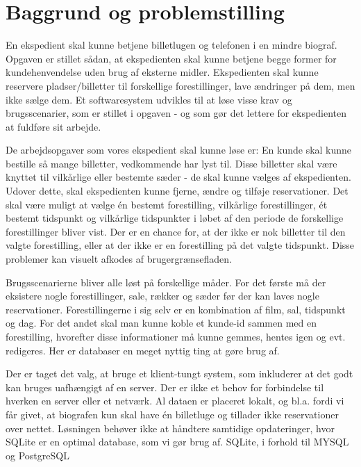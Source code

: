 \chapter{Baggrund og problemstilling}

En ekspedient skal kunne betjene billetlugen og telefonen i en mindre biograf. Opgaven er stillet sådan, at ekspedienten skal kunne betjene begge former for kundehenvendelse uden brug af eksterne midler. Ekspedienten skal kunne reservere pladser/billetter til forskellige forestillinger, lave ændringer på dem, men ikke sælge dem. Et softwaresystem udvikles til at løse visse krav og brugsscenarier, som er stillet i opgaven - og som gør det lettere for ekspedienten at fuldføre sit arbejde.

De arbejdsopgaver som vores ekspedient skal kunne løse er:
En kunde skal kunne bestille så mange billetter, vedkommende har lyst til. Disse billetter skal være knyttet til vilkårlige eller bestemte sæder - de skal kunne vælges af ekspedienten. Udover dette, skal ekspedienten kunne fjerne, ændre og tilføje reservationer. Det skal være muligt at vælge én bestemt forestilling, vilkårlige forestillinger, ét bestemt tidspunkt og vilkårlige tidspunkter i løbet af den periode de forskellige forestillinger bliver vist.
Der er en chance for, at der ikke er nok billetter til den valgte forestilling, eller at der ikke er en forestilling på det valgte tidspunkt. Disse problemer kan visuelt afkodes af brugergrænsefladen.

Brugsscenarierne bliver alle løst på forskellige måder. For det første må der eksistere nogle forestillinger, sale, rækker og sæder før der kan laves nogle reservationer. Forestillingerne i sig selv er en kombination af film, sal, tidspunkt og dag. For det andet skal man kunne koble et kunde-id sammen med en forestilling, hvorefter disse informationer må kunne gemmes, hentes igen og evt. redigeres. Her er databaser en meget nyttig ting at gøre brug af. 

Der er taget det valg, at bruge et klient-tungt system, som inkluderer at det godt kan bruges uafhængigt af en server. Der er ikke et behov for forbindelse til hverken en server eller et netværk. Al dataen er placeret lokalt, og  bl.a. fordi vi får givet, at biografen kun skal have én billetluge og tillader ikke reservationer over nettet. Løsningen behøver ikke at håndtere samtidige opdateringer, hvor SQLite er en optimal database, som vi gør brug af. SQLite, i forhold til MYSQL og PostgreSQL





